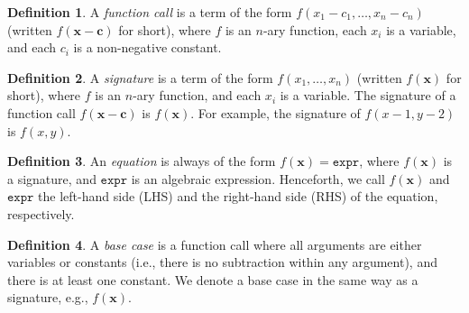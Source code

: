 \documentclass{article}
\theoremstyle{definition}
\newtheorem{definition}{Definition}
\newcommand{\expr}{\mathtt{expr}}
\begin{document}

\begin{definition}
  A \emph{function call} is a term of the form
  $f(x_{1} - c_{1}, \dots, x_{n} - c_{n})$ (written $f(\mathbf{x} - \mathbf{c})$
  for short), where $f$ is an $n$-ary function, each $x_{i}$ is a variable, and
  each $c_{i}$ is a non-negative constant.
\end{definition}

\begin{definition}
  A \emph{signature} is a term of the form $f(x_{1}, \dots, x_{n})$ (written
  $f(\mathbf{x})$ for short), where $f$ is an $n$-ary function, and each $x_{i}$
  is a variable. The signature of a function call $f(\mathbf{x} - \mathbf{c})$
  is $f(\mathbf{x})$. For example, the signature of $f(x - 1, y - 2)$ is
  $f(x, y)$.
\end{definition}

\begin{definition}
  An \emph{equation} is always of the form $f(\mathbf{x}) = \expr{}$, where
  $f(\mathbf{x})$ is a signature, and $\expr{}$ is an algebraic expression.
  Henceforth, we call $f(\mathbf{x})$ and $\expr{}$ the left-hand side (LHS) and
  the right-hand side (RHS) of the equation, respectively.
\end{definition}

\begin{definition}
  A \emph{base case} is a function call where all arguments are either variables
  or constants (i.e., there is no subtraction within any argument), and there is
  at least one constant. We denote a base case in the same way as a signature,
  e.g., $f(\mathbf{x})$.
\end{definition}
\end{document}
